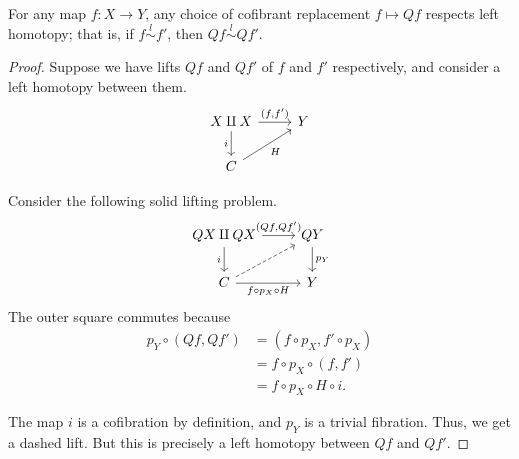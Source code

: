 \documentclass[main.tex]{subfiles}
\begin{document}
\begin{lemma}
  For any map $f\colon X \to Y$, any choice of cofibrant replacement $f \mapsto Qf$ respects left homotopy; that is, if $f \overset{l}{\sim} f'$, then $Qf \overset{l}{\sim} Qf'$.
\end{lemma}
\begin{proof}
  Suppose we have lifts $Qf$ and $Qf'$ of $f$ and $f'$ respectively, and consider a left homotopy between them.
  \begin{equation*}
    \begin{tikzcd}
      X \amalg X
      \arrow[d, swap, "i"]
      \arrow[r, "{(f, f')}"]
      & Y
      \\
      C
      \arrow[ur, swap, "H"]
    \end{tikzcd}
  \end{equation*}

  Consider the following solid lifting problem.
  \begin{equation*}
    \begin{tikzcd}
      QX \amalg QX
      \arrow[r, "{(Qf, Qf')}"]
      \arrow[d, swap, "i"]
      & QY
      \arrow[d, "p_{Y}"]
      \\
      C
      \arrow[r, swap, "f \circ p_{X} \circ H"]
      \arrow[ur, dashed]
      & Y
    \end{tikzcd}
  \end{equation*}
  The outer square commutes because
  \begin{align*}
    p_{Y} \circ (Qf, Qf') &= (f \circ p_{X}, f' \circ p_{X})
    \\
    &= f \circ p_{X} \circ (f, f')
    \\
    &= f \circ p_{X} \circ H \circ i.
  \end{align*}

  The map $i$ is a cofibration by definition, and $p_{Y}$ is a trivial fibration. Thus, we get a dashed lift. But this is precisely a left homotopy between $Qf$ and $Qf'$.
\end{proof}
\end{document}
